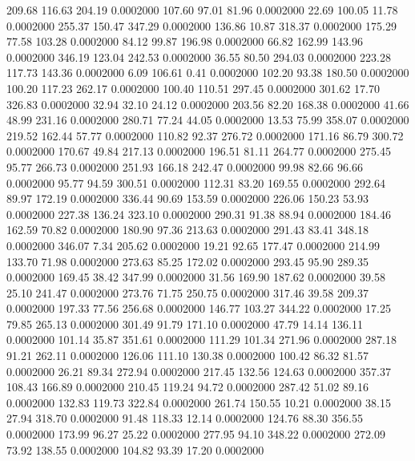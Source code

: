  209.68  116.63  204.19   0.0002000
 107.60   97.01   81.96   0.0002000
  22.69  100.05   11.78   0.0002000
 255.37  150.47  347.29   0.0002000
 136.86   10.87  318.37   0.0002000
 175.29   77.58  103.28   0.0002000
  84.12   99.87  196.98   0.0002000
  66.82  162.99  143.96   0.0002000
 346.19  123.04  242.53   0.0002000
  36.55   80.50  294.03   0.0002000
 223.28  117.73  143.36   0.0002000
   6.09  106.61    0.41   0.0002000
 102.20   93.38  180.50   0.0002000
 100.20  117.23  262.17   0.0002000
 100.40  110.51  297.45   0.0002000
 301.62   17.70  326.83   0.0002000
  32.94   32.10   24.12   0.0002000
 203.56   82.20  168.38   0.0002000
  41.66   48.99  231.16   0.0002000
 280.71   77.24   44.05   0.0002000
  13.53   75.99  358.07   0.0002000
 219.52  162.44   57.77   0.0002000
 110.82   92.37  276.72   0.0002000
 171.16   86.79  300.72   0.0002000
 170.67   49.84  217.13   0.0002000
 196.51   81.11  264.77   0.0002000
 275.45   95.77  266.73   0.0002000
 251.93  166.18  242.47   0.0002000
  99.98   82.66   96.66   0.0002000
  95.77   94.59  300.51   0.0002000
 112.31   83.20  169.55   0.0002000
 292.64   89.97  172.19   0.0002000
 336.44   90.69  153.59   0.0002000
 226.06  150.23   53.93   0.0002000
 227.38  136.24  323.10   0.0002000
 290.31   91.38   88.94   0.0002000
 184.46  162.59   70.82   0.0002000
 180.90   97.36  213.63   0.0002000
 291.43   83.41  348.18   0.0002000
 346.07    7.34  205.62   0.0002000
  19.21   92.65  177.47   0.0002000
 214.99  133.70   71.98   0.0002000
 273.63   85.25  172.02   0.0002000
 293.45   95.90  289.35   0.0002000
 169.45   38.42  347.99   0.0002000
  31.56  169.90  187.62   0.0002000
  39.58   25.10  241.47   0.0002000
 273.76   71.75  250.75   0.0002000
 317.46   39.58  209.37   0.0002000
 197.33   77.56  256.68   0.0002000
 146.77  103.27  344.22   0.0002000
  17.25   79.85  265.13   0.0002000
 301.49   91.79  171.10   0.0002000
  47.79   14.14  136.11   0.0002000
 101.14   35.87  351.61   0.0002000
 111.29  101.34  271.96   0.0002000
 287.18   91.21  262.11   0.0002000
 126.06  111.10  130.38   0.0002000
 100.42   86.32   81.57   0.0002000
  26.21   89.34  272.94   0.0002000
 217.45  132.56  124.63   0.0002000
 357.37  108.43  166.89   0.0002000
 210.45  119.24   94.72   0.0002000
 287.42   51.02   89.16   0.0002000
 132.83  119.73  322.84   0.0002000
 261.74  150.55   10.21   0.0002000
  38.15   27.94  318.70   0.0002000
  91.48  118.33   12.14   0.0002000
 124.76   88.30  356.55   0.0002000
 173.99   96.27   25.22   0.0002000
 277.95   94.10  348.22   0.0002000
 272.09   73.92  138.55   0.0002000
 104.82   93.39   17.20   0.0002000
